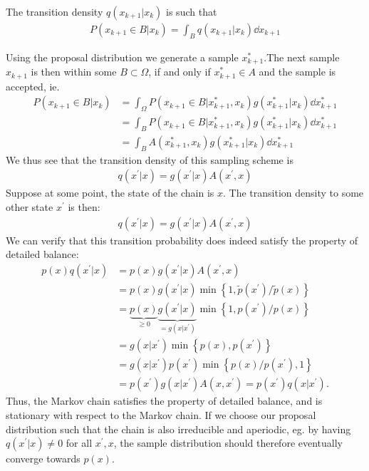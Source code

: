 The transition density $q(x_{k+1}|x_k)$ is such that 
\begin{align}
    P(x_{k+1} \in B | x_k ) = \int_B q (x_{k+1}|x_k )\dd x_{k+1}
\end{align}

Using the proposal distribution we generate a sample $x^\ast_{k+1}$.The next sample $x_{k+1}$ is then within some $B\subset \Omega$, if and only if $x^\ast_{k+1}\in A$ and the sample is accepted, ie.
\begin{equation}
    \begin{aligned}
        P(x_{k+1} \in B | x_k ) 
        &= \int_\Omega P( x_{k+1} \in B | x^\ast_{k+1},x_k) g(x^\ast_{k+1}|x_k) \dd{x^\ast_{k+1}}\\
        &= \int_B P( x_{k+1} \in B | x^\ast_{k+1},x_k) g(x^\ast_{k+1}|x_k) \dd{x^\ast_{k+1}} \\
        &= \int_B A(x^\ast_{k+1}, x_k) g(x^\ast_{k+1}|x_k) \dd{x^\ast_{k+1}}
    \end{aligned}
\end{equation}
We thus see that the transition density of this sampling scheme is
\begin{align}
    q(x^\prime|x) = g(x^\prime | x) A(x^\prime, x)
\end{align} 
Suppose at some point, the state of the chain is $x$. The transition density to some other state $x^\prime$ is then:
\begin{align*}
    q(x^\prime|x) = g(x^\prime | x) A(x^\prime, x)
\end{align*}
We can verify that this transition probability does indeed satisfy the property of detailed balance:
\begin{align*}
    p(x)q(x^\prime|x) &= p(x)g(x^\prime | x) A(x^\prime, x) \\
                      &= p(x)g(x^\prime | x) \min\left\{1,  \tilde{p}(x^\prime) / \tilde{p}(x)\right\} \\
                      &= \underbrace{p(x)}_{\geq 0} \underbrace{g(x^\prime | x)}_{=g(x | x^\prime)} \min\left\{1,  p(x^\prime) / p(x)\right\} \\
                      &= g(x | x^\prime) \min\left\{p(x), p(x^\prime)\right\} \\
                      &= g(x | x^\prime) p(x^\prime) \min\left\{p(x)/p(x^\prime), 1\right\} \\
                      &= p(x^\prime) g(x | x^\prime)  A(x ,x^\prime) = p(x^\prime) q(x|x^\prime).
\end{align*}
Thus, the Markov chain satisfies the property of detailed balance, and is stationary with respect to the Markov chain. If we choose our proposal distribution such that the chain is also irreducible and aperiodic, eg. by having $q(x^\prime|x) \neq 0$ for all $x^\prime,x$, the sample distribution should therefore eventually converge towards $p(x)$. 

